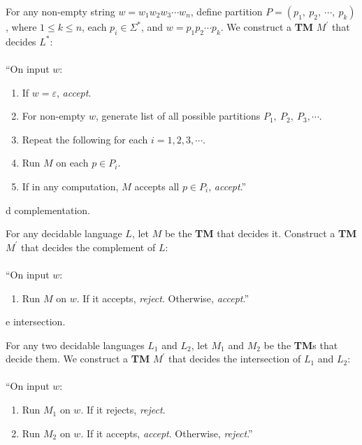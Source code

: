 \documentclass[11pt]{article}
\begin{document}
For any non-empty string $w = w_1w_2w_3 \cdots w_n$, define partition $P = (p_1, \  p_2, \ \cdots , \ p_k)$, where $1 \leq k \leq n$, each $p_i \in \Sigma^{*}$, and $w = p_1  p_2 \cdots p_k$. We construct a \textbf{TM} $M^{'}$ that decides $L^{*}$: \\
\\
\textquotedblleft On input $w$:
\begin{enumerate}
\item If $w = \varepsilon$, \textit{accept}.
\item For non-empty $w$, generate list of all possible partitions $P_1, \ P_2, \ P_3, \cdots$.
\item Repeat the following for each $i = 1, 2, 3, \cdots$.
\item \hspace*{0.5cm} Run $M$ on each $p \in P_i$.
\item \hspace*{0.5cm} If in any computation, $M$ accepts all $p \in P_i$, \textit{accept}.\textquotedblright
\end{enumerate}

\begin{problem}[Part]{d}
complementation.
\end{problem}

For any decidable language $L$, let $M$ be the \textbf{TM} that decides it. Construct a \textbf{TM} $M^{'}$ that decides the complement of $L$: \\
\\
\textquotedblleft On input $w$:
\begin{enumerate}
\item Run $M$ on $w$. If it accepts, \textit{reject}. Otherwise, \textit{accept}.\textquotedblright
\end{enumerate}

\begin{problem}[Part]{e}
intersection.
\end{problem}

For any two decidable languages $L_1$ and $L_2$, let $M_1$ and $M_2$ be the \textbf{TM}s that decide them. We construct a \textbf{TM} $M^{'}$ that decides the intersection of $L_1$ and $L_2$: \\
\\
\textquotedblleft On input $w$:
\begin{enumerate}
\item Run $M_1$ on $w$. If it rejects, \textit{reject}.
\item Run $M_2$ on $w$. If it accepts, \textit{accept}. Otherwise, \textit{reject}.\textquotedblright
\end{enumerate}
\end{document}
